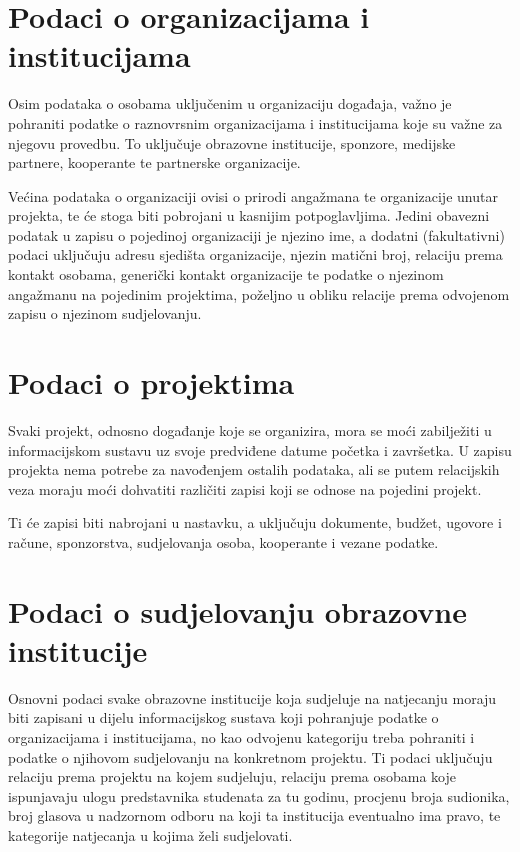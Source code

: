 \documentclass[times, utf8, diplomski]{fer}
\begin{document}
\section{Podaci o organizacijama i institucijama}

Osim podataka o osobama uključenim u organizaciju događaja, važno je pohraniti
podatke o raznovrsnim organizacijama i institucijama koje su važne za njegovu
provedbu. To uključuje obrazovne institucije, sponzore, medijske partnere,
kooperante te partnerske organizacije.

Većina podataka o organizaciji ovisi o prirodi angažmana te organizacije unutar
projekta, te će stoga biti pobrojani u kasnijim potpoglavljima. Jedini obavezni
podatak u zapisu o pojedinoj organizaciji je njezino ime, a dodatni
(fakultativni) podaci uključuju adresu sjedišta organizacije, njezin matični
broj, relaciju prema kontakt osobama, generički kontakt organizacije te podatke
o njezinom angažmanu na pojedinim projektima, poželjno u obliku relacije prema
odvojenom zapisu o njezinom sudjelovanju.

\section{Podaci o projektima}

Svaki projekt, odnosno događanje koje se organizira, mora se moći zabilježiti u
informacijskom sustavu uz svoje predviđene datume početka i završetka. U zapisu
projekta nema potrebe za navođenjem ostalih podataka, ali se putem relacijskih
veza moraju moći dohvatiti različiti zapisi koji se odnose na pojedini projekt.

Ti će zapisi biti nabrojani u nastavku, a uključuju dokumente, budžet, ugovore i
račune, sponzorstva, sudjelovanja osoba, kooperante i vezane podatke.

\section{Podaci o sudjelovanju obrazovne institucije}

Osnovni podaci svake obrazovne institucije koja sudjeluje na natjecanju moraju
biti zapisani u dijelu informacijskog sustava koji pohranjuje podatke o
organizacijama i institucijama, no kao odvojenu kategoriju treba pohraniti i
podatke o njihovom sudjelovanju na konkretnom projektu. Ti podaci uključuju
relaciju prema projektu na kojem sudjeluju, relaciju prema osobama koje
ispunjavaju ulogu predstavnika studenata za tu godinu, procjenu broja sudionika,
broj glasova u nadzornom odboru na koji ta institucija eventualno ima pravo,
te kategorije natjecanja u kojima želi sudjelovati.
\end{document}
